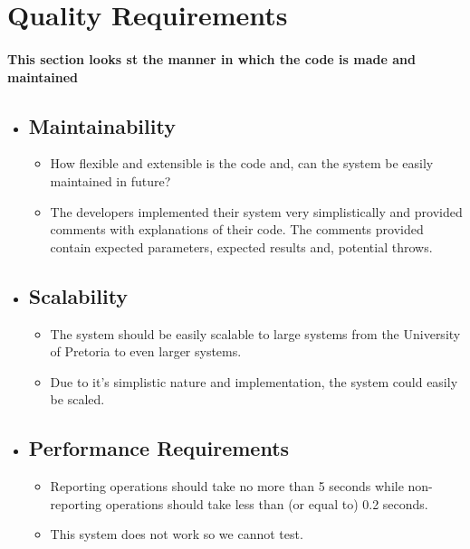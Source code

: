 \begin{itemize}
        \end{itemize}
    
    \section{Quality Requirements}
    \paragraph{This section looks st the manner in which the code is made and maintained}
        \begin{itemize}
            \item \subsection{Maintainability}
                \begin{itemize}
                    \item How flexible and extensible is the code and, can the system be easily maintained in future?
                    \item The developers implemented their system very simplistically and provided comments with explanations of their code. The comments provided contain expected parameters, expected results and, potential throws.
                \end{itemize}
                
            \item \subsection{Scalability}
                \begin{itemize}
                    \item The system should be easily scalable to large systems from the University of Pretoria to even larger systems.
                    \item Due to it's simplistic nature and implementation, the system could easily be scaled.
                \end{itemize}
                
            \item \subsection{Performance Requirements}
                \begin{itemize}
                    \item Reporting operations should take no more than 5 seconds while non-reporting operations should take less than (or equal to) 0.2 seconds.
                    \item This system does not work so we cannot test.
                \end{itemize}
                

\end{itemize}
